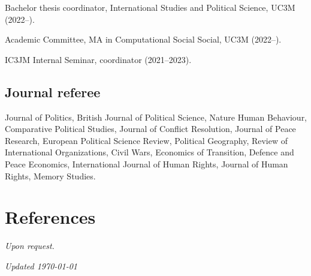 \documentclass[a4paper, 12pt]{article}
\begin{document}
\noindent
Bachelor thesis coordinator, International Studies and Political Science, UC3M (2022--).

\noindent
Academic Committee, MA in Computational Social Social, UC3M (2022--).

\noindent
IC3JM Internal Seminar, coordinator (2021--2023).

\subsection*{Journal referee}

Journal of Politics, British Journal of Political Science, Nature Human Behaviour, Comparative Political Studies, Journal of Conflict Resolution, Journal of Peace Research, European Political Science Review, Political Geography, Review of International Organizations, Civil Wars, Economics of Transition, Defence and Peace Economics, International Journal of Human Rights, Journal of Human Rights, Memory Studies. %


\section*{References}

\textit{Upon request.}

%
%
%

\vfill

\noindent
\flushright
{\small\it Updated \monthdate\today}
\end{document}
